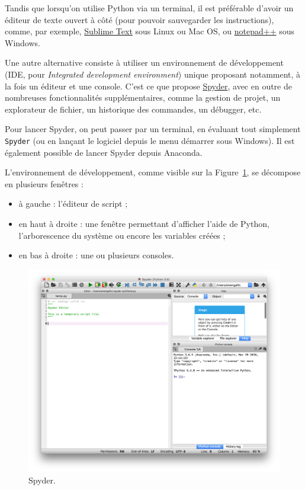 \documentclass[
  12pt,
]{book}
\providecommand{\tightlist}{%
  \setlength{\itemsep}{0pt}\setlength{\parskip}{0pt}}
\numberwithin{equation}{section}
\numberwithin{countremarque}{section}
\begin{document}
Tandis que lorsqu'on utilise Python via un terminal, il est préférable d'avoir un éditeur de texte ouvert à côté (pour pouvoir sauvegarder les instructions), comme, par exemple, \href{https://www.sublimetext.com/}{Sublime Text} sous Linux ou Mac OS, ou \href{https://notepad-plus-plus.org/}{notepad++} sous Windows.

Une autre alternative consiste à utiliser un environnement de développement (IDE, pour \emph{Integrated development environment}) unique proposant notamment, à la fois un éditeur et une console. C'est ce que propose \href{https://www.spyder-ide.org/}{Spyder}, avec en outre de nombreuses fonctionnalités supplémentaires, comme la gestion de projet, un explorateur de fichier, un historique des commandes, un débugger, etc.

Pour lancer Spyder, on peut passer par un terminal, en évaluant tout simplement \texttt{Spyder} (ou en lançant le logiciel depuis le menu démarrer sous Windows). Il est également possible de lancer Spyder depuis Anaconda.

L'environnement de développement, comme visible sur la Figure~\ref{fig:intro-spyder}, se décompose en plusieurs fenêtres :

\begin{itemize}
\tightlist
\item
  à gauche : l'éditeur de script ;
\item
  en haut à droite : une fenêtre permettant d'afficher l'aide de Python, l'arborescence du système ou encore les variables créées ;
\item
  en bas à droite : une ou plusieurs consoles.
\end{itemize}

\begin{figure}[H]

{\centering \includegraphics[width=1\linewidth]{figs/spyder} 

}

\caption{Spyder.}\label{fig:intro-spyder}
\end{figure}
\end{document}
